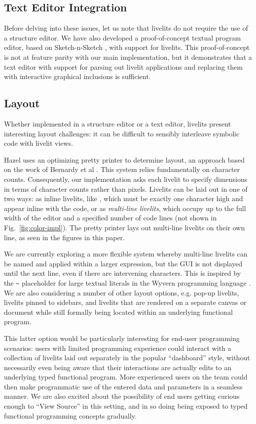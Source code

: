 \subsection{Text Editor Integration}
Before delving into these issues, let us note that livelits do not require the use of a structure editor. 
We have also developed a 
proof-of-concept textual program editor, based on Sketch-n-Sketch \cite{sns-pldi,sns-uist}, with support for livelits.
This proof-of-concept is not at feature parity with 
our main implementation, but it demonstrates that a text editor with support for 
parsing out livelit applications and replacing them with interactive graphical inclusions is sufficient.

\subsection{Layout}\label{sec:layout}
Whether implemented in a structure editor or a text editor, livelits present 
interesting layout challenges: it can be difficult to sensibly 
interleave symbolic code with livelit views. 

Hazel uses an optimizing pretty printer to determine layout, an approach 
based on the work of Bernardy et al . This system relies 
fundamentally on character counts. Consequently, our implementation asks each 
livelit to specify dimensions in terms of character counts rather than pixels.
Livelits can be laid out in one of two ways: as inline livelits, like ,
which must be exactly one character high and appear inline with the code,
or as \emph{multi-line livelits}, which occupy up to the full width of the editor 
and a specified number of code lines (not shown in Fig.~\ref{fig:color-impl}). 
The pretty printer lays out multi-line livelits
on their own line, as seen in the figures in this paper. 

We are currently exploring a more flexible system whereby 
multi-line livelits can be named and applied within a larger expression, but
the GUI is not displayed until the next line, even if there are intervening characters.
This is inspired by the \verb|~| placeholder for large textual literals in the 
Wyvern programming language \cite{TSLs}. We are also considering a number of other layout 
options, e.g. pop-up livelits, livelits pinned to sidebars, and livelits that are rendered  
on a separate canvas or document while still formally being located within an underlying functional program. 

This latter option 
would be particularly interesting for end-user programming scenarios: users with limited
programming experience 
could interact with a collection of livelits laid out separately in the popular ``dashboard'' style, 
without necessarily
even being aware that their interactions are actually edits to an underlying typed
functional program. More experienced users on the team could then make programmatic use of the entered
data and parameters in a seamless manner. We are also excited about the possibility of end users
getting curious enough to ``View Source'' in this setting, and in so doing 
being exposed to typed functional programming concepts gradually.

